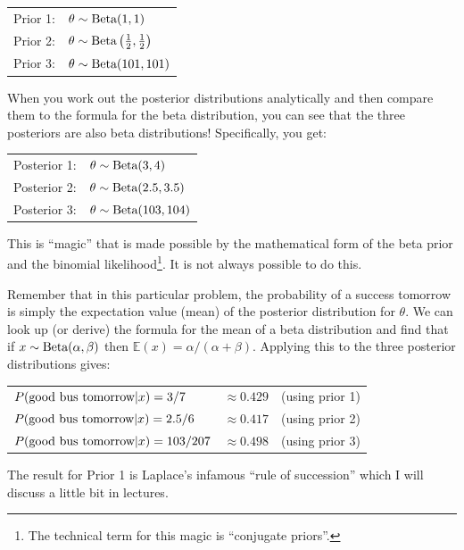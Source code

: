 \begin{table}[ht!]\begin{center}
\begin{tabular}{ll}
Prior 1: & $\theta \sim \textnormal{Beta}(1, 1)$\\
Prior 2: & $\theta \sim \textnormal{Beta}\left(\frac{1}{2}, \frac{1}{2}\right)$\\
Prior 3: & $\theta \sim \textnormal{Beta}(101, 101)$\\
\end{tabular}\end{center}
\end{table}

When you work out the posterior distributions analytically and then compare them
to the formula for the beta distribution, you can see that the three posteriors
are also beta distributions! Specifically, you get:

\begin{table}[ht!]\begin{center}
\begin{tabular}{ll}
Posterior 1: & $\theta \sim \textnormal{Beta}(3, 4)$\\
Posterior 2: & $\theta \sim \textnormal{Beta}(2.5, 3.5)$\\
Posterior 3: & $\theta \sim \textnormal{Beta}(103, 104)$
\end{tabular}\end{center}
\end{table}
This is ``magic'' that is made possible by the mathematical form of the beta
prior and the binomial likelihood\footnote{The technical term for this magic is ``conjugate priors''.}. It is not always possible to do this.

Remember that in this particular problem, the probability of a success tomorrow
is simply the expectation value (mean) of the posterior distribution for $\theta$.
We can look up (or derive) the formula for the mean of a beta distribution and find that
if $x \sim \textnormal{Beta}(\alpha, \beta)$ then $\mathds{E}(x) = \alpha/(\alpha + \beta)$.
Applying this to the three posterior distributions gives:

\begin{table}[ht!]\begin{center}
\begin{tabular}{lll}
$P(\textnormal{good bus tomorrow}|x) = 3/7 $    & $\approx 0.429$ & (using prior 1)\\
$P(\textnormal{good bus tomorrow}|x) = 2.5/6$   & $\approx 0.417$ & (using prior 2)\\
$P(\textnormal{good bus tomorrow}|x) = 103/207$ & $\approx 0.498$ & (using prior 3)
\end{tabular}\end{center}
\end{table}
The result for Prior 1 is Laplace's infamous ``rule of succession'' which I will
discuss a little bit in lectures.

